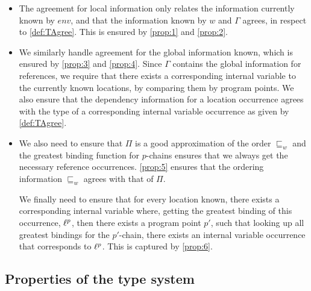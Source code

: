 \documentclass[acmsmall,sigplan]{acmart}
\begin{document}

\begin{itemize}
	\item The agreement for local information only relates the information currently known by $env$, and that the information known by $w$ and $\Gamma$ agrees, in respect to \cref{def:TAgree}.
		This is ensured by \eqref{prop:1} and \eqref{prop:2}.

	\item We similarly handle agreement for the global information
          known, which is ensured by \eqref{prop:3} and
          \eqref{prop:4}. 
		Since $\Gamma$ contains the global information for
                references, we require that there exists a
                corresponding internal variable to the currently known
                locations, by comparing them by program points. 
		We also ensure that the dependency information for a location
                occurrence agrees with the type of a corresponding
                internal variable occurrence as given by \cref{def:TAgree}. 

	\item We also need to ensure that $\Pi$ is a good
          approximation of the order $\sqsubseteq_w$ and the greatest
          binding function for $p$-chains ensures that we always get
          the necessary reference occurrences. 
	\eqref{prop:5} ensures that the ordering information
        $\sqsubseteq_w$ agrees with that of $\Pi$.

	We finally need to ensure that for every location
        known, there exists a corresponding internal variable
        where, getting the greatest binding of this occurrence,
        $\ell^p$, then there exists a program point $p'$, such that
        looking up all greatest bindings for the $p'$-chain, there
        exists an internal variable occurrence that corresponds to
        $\ell^p$. This is captured by \eqref{prop:6}.
\end{itemize}

\subsection{Properties of the type system}
\end{document}
